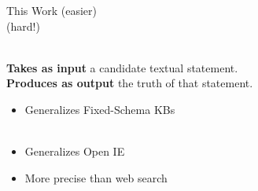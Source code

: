 \begin{frame}{This Work}
 (easier) \\
 (hard!)  \\
\vspace{2ex}
\pause

 \\
\hspace{2ex}\textbf{Takes as input} a candidate textual statement. \\
\hspace{2ex}\textbf{Produces as output} the truth of that statement. \\
\vspace{1ex}
\pause

\begin{itemize}
\item Generalizes Fixed-Schema KBs \\
       \\
\pause
\item Generalizes Open IE \\
\pause
\item More precise than web search \\
\end{itemize}




\end{frame}
